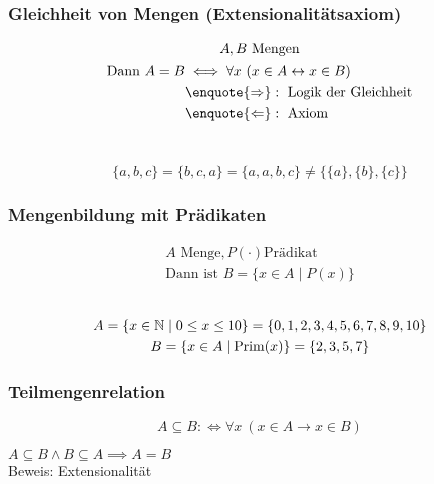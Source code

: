 \subsubsection{Gleichheit von Mengen (Extensionalitätsaxiom)}
\begin{gather*}
	A , B \text{ Mengen} \\
	\begin{aligned}
		\text{Dann } A = B	&\iff \forall x~( x \in A \leftrightarrow x \in B ) \\
						&\enquote{\Rightarrow}: \text{ Logik der Gleichheit} \\
						&\enquote{\Leftarrow}: \text{ Axiom}
	\end{aligned}
\end{gather*}\\
\begin{bsp*}
	\[ \{ a , b , c \} = \{ b , c , a \} = \{ a , a , b , c \} \neq \{ \{ a \} , \{ b \} , \{ c \} \} \]
\end{bsp*}

\subsubsection{Mengenbildung mit Prädikaten}
\begin{gather*}
	A \text{ Menge}, P( \cdot ) \text{Prädikat} \\
	\text{Dann ist } B = \{ x \in A \mid P( x ) \}
\end{gather*} \\
\begin{bsp*}
	\begin{gather*}
		A = \{ x \in \mathbb{N} \mid 0 \leq x \leq 10 \} = \{ 0 , 1 , 2 , 3 , 4 , 5 , 6 , 7 , 8 , 9 , 10 \} \\
		B = \{ x \in A \mid \operatorname{Prim}( x ) \} = \{ 2 , 3 , 5 , 7 \}
	\end{gather*}
\end{bsp*}

\subsubsection{Teilmengenrelation}
\[ A \subseteq B : \iff \forall x~( x \in A \rightarrow x \in B ) \]
\begin{satz*}
	$A \subseteq B \wedge B \subseteq A \implies A = B$ \\
	Beweis: Extensionalität
\end{satz*}

